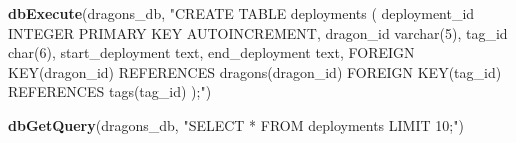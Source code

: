 \documentclass[
]{book}
\newenvironment{Shaded}{\begin{snugshade}}{\end{snugshade}}
\newcommand{\AttributeTok}[1]{\textcolor[rgb]{0.13,0.29,0.53}{#1}}
\newcommand{\ConstantTok}[1]{\textcolor[rgb]{0.56,0.35,0.01}{#1}}
\newcommand{\DecValTok}[1]{\textcolor[rgb]{0.00,0.00,0.81}{#1}}
\newcommand{\FunctionTok}[1]{\textcolor[rgb]{0.13,0.29,0.53}{\textbf{#1}}}
\newcommand{\NormalTok}[1]{#1}
\newcommand{\OtherTok}[1]{\textcolor[rgb]{0.56,0.35,0.01}{#1}}
\newcommand{\SpecialCharTok}[1]{\textcolor[rgb]{0.81,0.36,0.00}{\textbf{#1}}}
\newcommand{\StringTok}[1]{\textcolor[rgb]{0.31,0.60,0.02}{#1}}
\begin{document}
\begin{Shaded}
\begin{Highlighting}[]
\FunctionTok{dbExecute}\NormalTok{(dragons\_db, }\StringTok{"CREATE TABLE deployments (}
\StringTok{deployment\_id INTEGER PRIMARY KEY AUTOINCREMENT,}
\StringTok{dragon\_id varchar(5),}
\StringTok{tag\_id char(6),}
\StringTok{start\_deployment text,}
\StringTok{end\_deployment text,}
\StringTok{FOREIGN KEY(dragon\_id) REFERENCES dragons(dragon\_id)}
\StringTok{FOREIGN KEY(tag\_id) REFERENCES tags(tag\_id)}
\StringTok{);"}\NormalTok{)}
\end{Highlighting}
\end{Shaded}

\begin{Shaded}
\end{Shaded}

\begin{Shaded}
\begin{Highlighting}[]
\FunctionTok{dbGetQuery}\NormalTok{(dragons\_db, }\StringTok{"SELECT * FROM deployments LIMIT 10;"}\NormalTok{)}
\end{Highlighting}
\end{Shaded}
\end{document}
